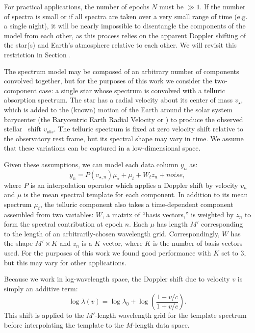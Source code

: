 \documentclass[modern]{aastex62}
\begin{document}
For practical applications, the number of epochs $N$ must be $\gg 1$. If the number of spectra is small or if all spectra are taken over a very small range of time (e.g. a single night), it will be nearly impossible to disentangle the components of the model from each other, as this process relies on the apparent Doppler shifting of the star(s) and Earth's atmosphere relative to each other. We will revisit this restriction in Section \label{s:future}.

The spectrum model may be composed of an arbitrary number of components convolved together, but for the purposes of this work we consider the two-component case: a single star whose spectrum is convolved with a telluric absorption spectrum. 
The star has a radial velocity about its center of mass $v_{\star}$, which is added to the (known) motion of the Earth around the solar system barycenter (the Barycentric Earth Radial Velocity or \BERV ) to produce the observed stellar \RV\ shift $v_{obs}$. 
The telluric spectrum is fixed at zero velocity shift relative to the observatory rest frame, but its spectral shape may vary in time. 
We assume that these variations can be captured in a low-dimensional space.

Given these assumptions, we can model each data column $y_n$ as:
$$y_n = P(v_{\star, n}) \mu_{\star} + \mu_{t} + W_{t} z_n + noise,$$
where $P$ is an interpolation operator which applies a Doppler shift by velocity $v_n$ and $\mu$ is the mean spectral template for each component.  In addition to its mean spectrum $\mu_t$, the telluric component also takes a time-dependent component assembled from two variables: $W$, a matrix of ``basis vectors,'' is weighted by $z_n$ to form the spectral contribution at epoch $n$. 
Each $\mu$ has length $M'$ corresponding to the length of an arbitrarily-chosen wavelength grid. 
Correspondingly, $W$ has the shape $M' \times K$ and $z_n$ is a $K$-vector, where $K$ is the number of basis vectors used. 
For the purposes of this work we found good performance with $K$ set to 3, but this may vary for other applications.

Because we work in log-wavelength space, the Doppler shift due to velocity $v$ is simply an additive term:
$$ \log \lambda(v) = \log \lambda_{0} + \log \left(\frac{1 - v/c}{1 + v/c}\right).
$$
This shift is applied to the $M'$-length wavelength grid for the template spectrum before interpolating the template to the $M$-length data space.
\end{document}
